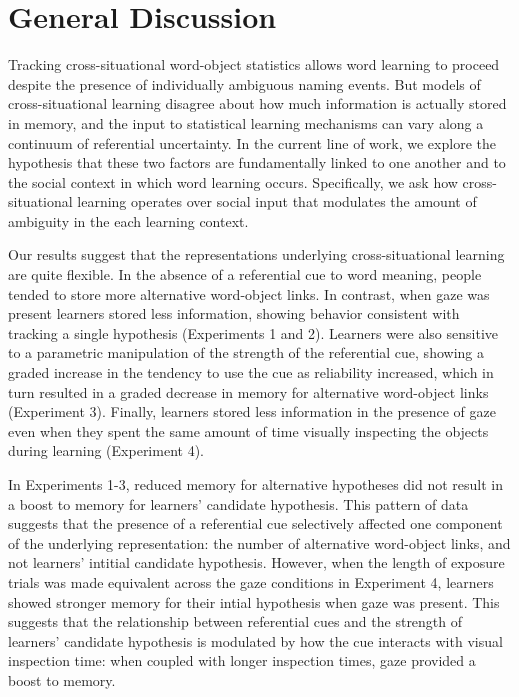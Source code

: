 \documentclass[authoryear, review]{elsarticle}
\begin{document}
\section{General Discussion}\label{general-discussion}

Tracking cross-situational word-object statistics allows word learning
to proceed despite the presence of individually ambiguous naming events.
But models of cross-situational learning disagree about how much
information is actually stored in memory, and the input to statistical
learning mechanisms can vary along a continuum of referential
uncertainty. In the current line of work, we explore the hypothesis that
these two factors are fundamentally linked to one another and to the
social context in which word learning occurs. Specifically, we ask how
cross-situational learning operates over social input that modulates the
amount of ambiguity in the each learning context.

Our results suggest that the representations underlying
cross-situational learning are quite flexible. In the absence of a
referential cue to word meaning, people tended to store more alternative
word-object links. In contrast, when gaze was present learners stored
less information, showing behavior consistent with tracking a single
hypothesis (Experiments 1 and 2). Learners were also sensitive to a
parametric manipulation of the strength of the referential cue, showing
a graded increase in the tendency to use the cue as reliability
increased, which in turn resulted in a graded decrease in memory for
alternative word-object links (Experiment 3). Finally, learners stored
less information in the presence of gaze even when they spent the same
amount of time visually inspecting the objects during learning
(Experiment 4).

In Experiments 1-3, reduced memory for alternative hypotheses did not
result in a boost to memory for learners' candidate hypothesis. This
pattern of data suggests that the presence of a referential cue
selectively affected one component of the underlying representation: the
number of alternative word-object links, and not learners' intitial
candidate hypothesis. However, when the length of exposure trials was
made equivalent across the gaze conditions in Experiment 4, learners
showed stronger memory for their intial hypothesis when gaze was
present. This suggests that the relationship between referential cues
and the strength of learners' candidate hypothesis is modulated by how
the cue interacts with visual inspection time: when coupled with longer
inspection times, gaze provided a boost to memory.
\end{document}
